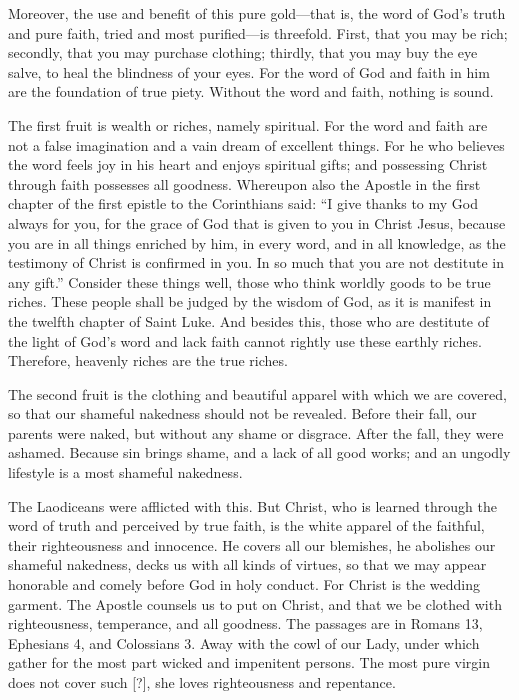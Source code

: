 Moreover, the use and benefit of this pure gold—that is, the word of God’s truth and pure faith, tried and most purified—is threefold. First, that you may be rich; secondly, that you may purchase clothing; thirdly, that you may buy the eye salve, to heal the blindness of your eyes. For the word of God and faith in him are the foundation of true piety. Without the word and faith, nothing is sound.

The first fruit is wealth or riches, namely spiritual. For the word and faith are not a false imagination and a vain dream of excellent things. For he who believes the word feels joy in his heart and enjoys spiritual gifts; and possessing Christ through faith possesses all goodness. Whereupon also the Apostle in the first chapter of the first epistle to the Corinthians said: “I give thanks to my God always for you, for the grace of God that is given to you in Christ Jesus, because you are in all things enriched by him, in every word, and in all knowledge, as the testimony of Christ is confirmed in you. In so much that you are not destitute in any gift.” Consider these things well, those who think worldly goods to be true riches. These people shall be judged by the wisdom of God, as it is manifest in the twelfth chapter of Saint Luke. And besides this, those who are destitute of the light of God’s word and lack faith cannot rightly use these earthly riches. Therefore, heavenly riches are the true riches.

The second fruit is the clothing and beautiful apparel with which we are covered, so that our shameful nakedness should not be revealed. Before their fall, our parents were naked, but without any shame or disgrace. After the fall, they were ashamed. Because sin brings shame, and a lack of all good works; and an ungodly lifestyle is a most shameful nakedness.

The Laodiceans were afflicted with this. But Christ, who is learned through the word of truth and perceived by true faith, is the white apparel of the faithful, their righteousness and innocence. He covers all our blemishes, he abolishes our shameful nakedness, decks us with all kinds of virtues, so that we may appear honorable and comely before God in holy conduct. For Christ is the wedding garment. The Apostle counsels us to put on Christ, and that we be clothed with righteousness, temperance, and all goodness. The passages are in Romans 13, Ephesians 4, and Colossians 3. Away with the cowl of our Lady, under which gather for the most part wicked and impenitent persons. The most pure virgin does not cover such [?], she loves righteousness and repentance.

